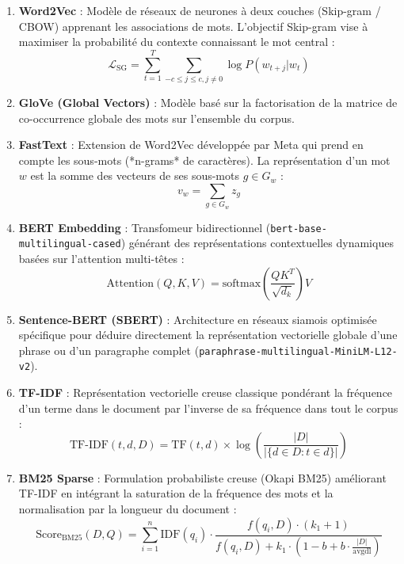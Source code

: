 \documentclass[12pt,a4paper,oneside]{report}
\begin{document}
\begin{enumerate}
    \item \textbf{Word2Vec} : Modèle de réseaux de neurones à deux couches (Skip-gram / CBOW) apprenant les associations de mots. L'objectif Skip-gram vise à maximiser la probabilité du contexte connaissant le mot central :
    \begin{equation}
    \mathcal{L}_{\text{SG}} = \sum_{t=1}^T \sum_{-c \le j \le c, j \neq 0} \log P(w_{t+j} | w_t)
    \end{equation}
    \item \textbf{GloVe (Global Vectors)} : Modèle basé sur la factorisation de la matrice de co-occurrence globale des mots sur l'ensemble du corpus.
    \item \textbf{FastText} : Extension de Word2Vec développée par Meta qui prend en compte les sous-mots (*n-grams* de caractères). La représentation d'un mot $w$ est la somme des vecteurs de ses sous-mots $g \in G_w$ :
    \begin{equation}
    v_w = \sum_{g \in G_w} z_g
    \end{equation}
    \item \textbf{BERT Embedding} : Transfomeur bidirectionnel (\texttt{bert-base-multilingual-cased}) générant des représentations contextuelles dynamiques basées sur l'attention multi-têtes :
    \begin{equation}
    \text{Attention}(Q, K, V) = \text{softmax}\left(\frac{QK^T}{\sqrt{d_k}}\right)V
    \end{equation}
    \item \textbf{Sentence-BERT (SBERT)} : Architecture en réseaux siamois optimisée spécifique pour déduire directement la représentation vectorielle globale d'une phrase ou d'un paragraphe complet (\texttt{paraphrase-multilingual-MiniLM-L12-v2}).
    \item \textbf{TF-IDF} : Représentation vectorielle creuse classique pondérant la fréquence d'un terme dans le document par l'inverse de sa fréquence dans tout le corpus :
    \begin{equation}
    \text{TF-IDF}(t, d, D) = \text{TF}(t, d) \times \log\left(\frac{|D|}{|\{d \in D : t \in d\}|}\right)
    \end{equation}
    \item \textbf{BM25 Sparse} : Formulation probabiliste creuse (Okapi BM25) améliorant TF-IDF en intégrant la saturation de la fréquence des mots et la normalisation par la longueur du document :
    \begin{equation}
    \text{Score}_{\text{BM25}}(D, Q) = \sum_{i=1}^n \text{IDF}(q_i) \cdot \frac{f(q_i, D) \cdot (k_1 + 1)}{f(q_i, D) + k_1 \cdot \left(1 - b + b \cdot \frac{|D|}{\text{avgdl}}\right)}
    \end{equation}
\end{enumerate}
\end{document}
